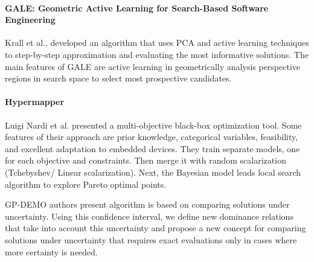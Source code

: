         \paragraph{GALE: Geometric Active Learning for Search-Based Software Engineering} Krall et al.,\cite{KrallMD15} developed an algorithm that uses PCA and active learning techniques to step-by-step approximation and evaluating the most informative solutions. The main features of GALE are active learning in geometrically analysis perspective regions in search space to select most prospective candidates.

        \paragraph{Hypermapper} Luigi Nardi et al. \cite{nardi2019practical} presented a multi-objective black-box optimization tool. Some features of their approach are prior knowledge, categorical variables, feasibility, and excellent adaptation to embedded devices. They train separate models, one for each objective and constraints. Then merge it with random scalarization (Tchebyshev/ Linear scalarization). Next, the Bayesian model leads local search algorithm to explore Pareto optimal points. 

        GP-DEMO \cite{MlakarPTF15} authors present algorithm is based on comparing solutions under uncertainty. Using this confidence interval, we define new dominance relations that take into account this uncertainty and propose a new concept for comparing solutions under uncertainty that requires exact evaluations only in cases where more certainty is needed.

